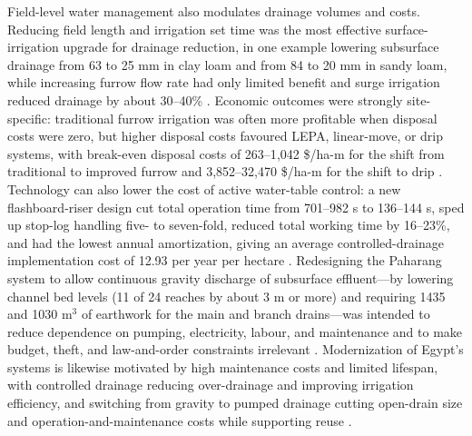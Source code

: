Field-level water management also modulates drainage volumes and costs. Reducing field length and irrigation set time was the most effective surface-irrigation upgrade for drainage reduction, in one example lowering subsurface drainage from 63 to 25 mm in clay loam and from 84 to 20 mm in sandy loam, while increasing furrow flow rate had only limited benefit and surge irrigation reduced drainage by about 30--40\% \parencite{HANSON1994}. Economic outcomes were strongly site-specific: traditional furrow irrigation was often more profitable when disposal costs were zero, but higher disposal costs favoured LEPA, linear-move, or drip systems, with break-even disposal costs of 263--1{,}042 \$/ha-m for the shift from traditional to improved furrow and 3{,}852--32{,}470 \$/ha-m for the shift to drip \parencite{HANSON1994}. Technology can also lower the cost of active water-table control: a new flashboard-riser design cut total operation time from 701--982 s to 136--144 s, sped up stop-log handling five- to seven-fold, reduced total working time by 16--23\%, and had the lowest annual amortization, giving an average controlled-drainage implementation cost of 12.93 per year per hectare \parencite{Napierala2024}. Redesigning the Paharang system to allow continuous gravity discharge of subsurface effluent---by lowering channel bed levels (11 of 24 reaches by about 3 m or more) and requiring 1435 and 1030 m$^{3}$ of earthwork for the main and branch drains---was intended to reduce dependence on pumping, electricity, labour, and maintenance and to make budget, theft, and law-and-order constraints irrelevant \parencite{Imran2021}. Modernization of Egypt's systems is likewise motivated by high maintenance costs and limited lifespan, with controlled drainage reducing over-drainage and improving irrigation efficiency, and switching from gravity to pumped drainage cutting open-drain size and operation-and-maintenance costs while supporting reuse \parencite{Ritzema2023}.

